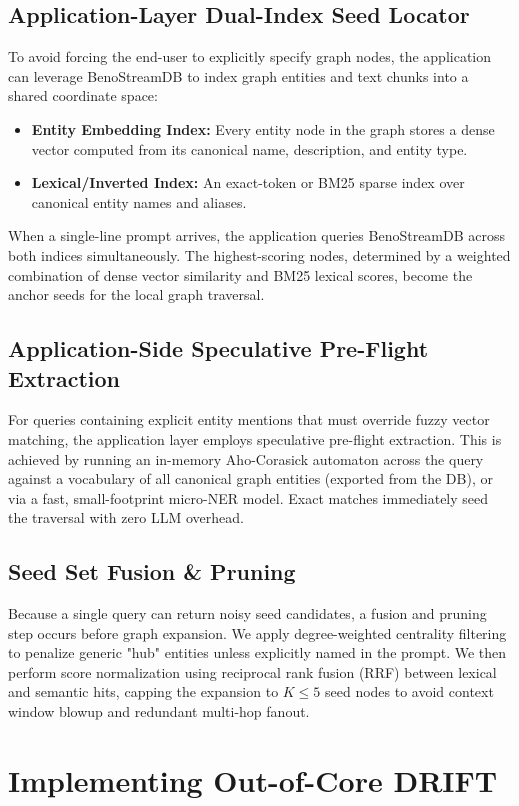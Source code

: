 \documentclass[11pt,twocolumn]{article}
\begin{document}
\subsection{Application-Layer Dual-Index Seed Locator}
To avoid forcing the end-user to explicitly specify graph nodes, the application can leverage BenoStreamDB to index graph entities and text chunks into a shared coordinate space:
\begin{itemize}
    \item \textbf{Entity Embedding Index:} Every entity node in the graph stores a dense vector computed from its canonical name, description, and entity type.
    \item \textbf{Lexical/Inverted Index:} An exact-token or BM25 sparse index over canonical entity names and aliases.
\end{itemize}
When a single-line prompt arrives, the application queries BenoStreamDB across both indices simultaneously. The highest-scoring nodes, determined by a weighted combination of dense vector similarity and BM25 lexical scores, become the anchor seeds for the local graph traversal.

\subsection{Application-Side Speculative Pre-Flight Extraction}
For queries containing explicit entity mentions that must override fuzzy vector matching, the application layer employs speculative pre-flight extraction. This is achieved by running an in-memory Aho-Corasick automaton across the query against a vocabulary of all canonical graph entities (exported from the DB), or via a fast, small-footprint micro-NER model. Exact matches immediately seed the traversal with zero LLM overhead.

\subsection{Seed Set Fusion \& Pruning}
Because a single query can return noisy seed candidates, a fusion and pruning step occurs before graph expansion. We apply degree-weighted centrality filtering to penalize generic "hub" entities unless explicitly named in the prompt. We then perform score normalization using reciprocal rank fusion (RRF) between lexical and semantic hits, capping the expansion to $K \le 5$ seed nodes to avoid context window blowup and redundant multi-hop fanout.

\section{Implementing Out-of-Core DRIFT}
\end{document}
